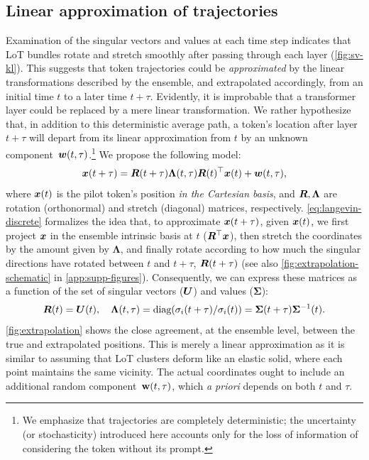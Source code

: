 \documentclass{article} %
\begin{document}
\subsection{Linear approximation of trajectories}
Examination of the singular vectors and values at each time step indicates that LoT bundles rotate and stretch smoothly after passing through each layer (\cref{fig:sv-kl}).
This suggests that token trajectories could be \emph{approximated} by the linear transformations described by the ensemble, and extrapolated accordingly, from an initial time $t$ to a later time $t+\tau$.
Evidently, it is improbable that a transformer layer could be replaced by a mere linear transformation.
We rather hypothesize that, in addition to this deterministic average path, a token's location after layer $t+\tau$ will depart from its linear approximation from $t$ by an unknown component~${\bm{w}}(t,\tau)$.\footnote{
We emphasize that trajectories are completely deterministic; the uncertainty (or stochasticity) introduced here accounts only for the loss of information of considering the token without its prompt.}
We propose the following model:
\begin{equation} \label{eq:langevin-discrete}
    {\bm{x}}(t + \tau) = {\bm{R}}(t+\tau) \mathbf{\Lambda}(t,\tau) {\bm{R}}(t)^{\top} {\bm{x}}(t) + {\bm{w}}(t,\tau),
\end{equation}
where ${\bm{x}}(t)$ is the pilot token's position \textit{in the Cartesian basis}, and ${\bm{R}}, \mathbf{\Lambda}$ are rotation (orthonormal) and stretch (diagonal) matrices, respectively. 
\cref{eq:langevin-discrete} formalizes the idea that, to approximate ${\bm{x}}(t+\tau)$, given ${\bm{x}}(t)$, we first project ${\bm{x}}$ in the ensemble intrinsic basis at $t$ (${\bm{R}}^{\top} {\bm{x}}$), then stretch the coordinates by the amount given by $\mathbf{\Lambda}$, and finally rotate according to how much the singular directions have rotated between $t$ and $t+\tau$, ${\bm{R}}(t+\tau)$ (see also \cref{fig:extrapolation-schematic} in \cref{app:supp-figures}). Consequently, we can express these matrices as a function of the set of singular vectors (${\bm{U}}$) and values ($\mathbf{\Sigma}$):
\[
    {\bm{R}}(t) = {\bm{U}}(t), 
    \quad 
    \mathbf{\Lambda}(t,\tau) = \text{diag}(\sigma_i(t+\tau)/\sigma_i(t)) = \mathbf{\Sigma}(t+\tau) \mathbf{\Sigma}^{-1}(t).
\]
\cref{fig:extrapolation} shows the close agreement, at the ensemble level, between the true and extrapolated positions. This is merely a linear approximation as it is similar to assuming that LoT clusters deform like an elastic solid, where each point maintains the same vicinity. 
The actual coordinates ought to include an additional random component~${\mathbf{w}}(t,\tau)$, which \textit{a priori} depends on both $t$ and $\tau$.
\end{document}
